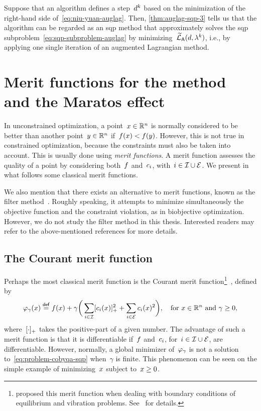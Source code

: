 Suppose that an algorithm defines a step~$\step[k]$ based on the minimization of the right-hand side of~\cref{eq:niu-yuan-auglag}.
Then, \cref{thm:auglag-sqp-3} tells us that the algorithm can be regarded as an \gls{sqp} method that approximately solves the \gls{sqp} subproblem~\cref{eq:sqp-subproblem-auglag} by minimizing~$\auglagalt(\step, \lm[k])$, i.e., by applying one single iteration of an augmented Lagrangian method.

\section{Merit functions for the  method and the Maratos effect}
\label{sec:sqp-merit-functions}

In unconstrained optimization, a point~$x \in \mathbb{R}^n$ is normally considered to be better than another point~$y \in \mathbb{R}^n$ if~$f(x) < f(y)$.
However, this is not true in constrained optimization, because the constraints must also be taken into account.
This is usually done using \emph{merit functions}.
A merit function assesses the quality of a point by considering both~$f$ and~$c_{i}$, with~$i \in \mathcal{I} \cup \mathcal{E}$.
We present in what follows some classical merit functions.

We also mention that there exists an alternative to merit functions, known as the filter method~\cite{Fletcher_Leyffer_2002,Fletcher_Leyffer_Toint_1998,Fletcher_Leyffer_Toint_2002,Fletcher_Leyffer_Toint_2006,Riberio_Karas_Gonzaga_2008}.
Roughly speaking, it attempts to minimize simultaneously the objective function and the constraint violation, as in biobjective optimization.
However, we do not study the filter method in this thesis.
Interested readers may refer to the above-mentioned references for more details.

\subsection{The Courant merit function}

Perhaps the most classical merit function is the Courant merit function\footnote{\citeauthor{Courant_1943} proposed this merit function when dealing with boundary conditions of equilibrium and vibration problems. See~\cite[Pt.~II, \S~3]{Courant_1943} for details.}~\cite{Courant_1943}, defined by
\begin{equation*}
    \merit_{\gamma}(\iter) \eqdef \obj(\iter) + \gamma \bigg( \sum_{i \in \iub} \posp{\con{i}(\iter)}^2 + \sum_{i \in \ieq} \con{i}(\iter)^2 \bigg), \quad \text{for~$x \in \R^n$ and~$\gamma \ge 0$,}
\end{equation*}
where~$[\cdot]_+$ takes the positive-part of a given number.
The advantage of such a merit function is that it is differentiable if~$f$ and~$c_{i}$, for~$i \in \mathcal{I} \cup \mathcal{E}$, are differentiable.
However, normally, a global minimizer of~$\merit_{\gamma}$ is not a solution to~\cref{eq:problem-cobyqa-sqp} when~$\gamma$ is finite.
This phenomenon can be seen on the simple example of minimizing~$\iter$ subject to~$\iter \ge 0$.

